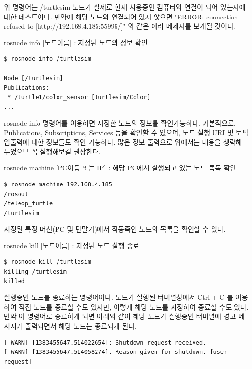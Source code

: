 \noindent
위 명령어는 /turtlesim 노드가 실제로 현재 사용중인 컴퓨터와 연결이 되어 있는지에 대한 테스트이다. 만약에 해당 노드와 연결되어 있지 않으면 "ERROR: connection refused to [http://192.168.4.185:55996/]" 와 같은 에러 메세지를 보게될 것이다.

\vspace{\baselineskip}
\noindent
{}\circled{\thenum} rosnode info [노드이름] : 지정된 노드의 정보 확인
\begin{lstlisting}[language=ROS]
$ rosnode info /turtlesim 
-------------------------------
Node [/turtlesim]
Publications: 
 * /turtle1/color_sensor [turtlesim/Color]
...
\end{lstlisting}

\vspace{\baselineskip}
\noindent
rosnode info 명령어를 이용하면 지정한 노드의 정보를 확인가능하다. 기본적으로, Publications, Subscriptions, Services 등을 확인할 수 있으며, 노드 실행 URI 및 토픽 입출력에 대한 정보들도 확인 가능하다. 많은 정보 출력으로 위에서는 내용을 생략해 두었으므 꼭 실행해보길 권장한다.

\vspace{\baselineskip}
\noindent
{}\circled{\thenum} rosnode machine [PC이름 또는 IP] : 해당 PC에서 실행되고 있는 노드 목록 확인
\begin{lstlisting}[language=ROS]
$ rosnode machine 192.168.4.185
/rosout
/teleop_turtle
/turtlesim
\end{lstlisting}

\noindent
지정된 특정 머신(PC 및 단말기)에서 작동죽인 노드의 목록을 확인할 수 있다.

\vspace{\baselineskip}
\noindent
{}\circled{\thenum} rosnode kill [노드이름] : 지정된 노드 실행 종료
\begin{lstlisting}[language=ROS]
$ rosnode kill /turtlesim
killing /turtlesim
killed
\end{lstlisting}

\noindent
실행중인 노드를 종료하는 명령어이다. 노드가 실행된 터미널창에서 Ctrl + C 를 이용하여 직접 노드를 종료할 수도 있지만, 이렇게 해당 노드를 지정하여 종료할 수도 있다. 만약 이 명령어로 종료하게 되면 아래와 같이 해당 노드가 실행중인 터미널에 경고 메시지가 출력되면서 해당 노드는 종료되게 된다.

\vspace{\baselineskip}
\begin{lstlisting}[language=ROS]
[ WARN] [1383455647.514022654]: Shutdown request received.
[ WARN] [1383455647.514058274]: Reason given for shutdown: [user request]
\end{lstlisting}

